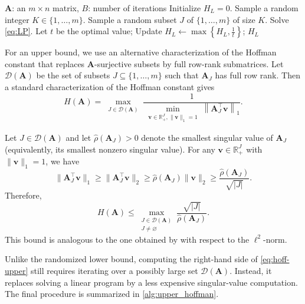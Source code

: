 \documentclass[10pt]{article}
\theoremstyle{definition}
\theoremstyle{remark}
\newcommand{\RR}{{\mathbb{R}}}
\def\vv{{\bm{v}}}
\def\mA{{\bm{A}}}
\begin{document}
\begin{algorithm}[ht]
  \caption{Randomized lower bound for the Hoffman constant}
    \begin{algorithmic}[1]
        \Require $\mA$: an $m\times n$ matrix, $B$: number of iterations
        \State Initialize $H_L=0$.
            \State Sample a random integer $K \in \{1, \dotsc, m\}$.
            \State Sample a random subset $J$ of $\{1,\dots,m\}$ of size $K$.
            \State Solve \eqref{eq:LP}. Let $t$ be the optimal value;
            \State Update $H_L \gets \max\left\{H_L,\frac{1}{t}\right\}$;
            \EndIf
        \EndFor
        \State \Return $H_L$ 
    \end{algorithmic}
    \label{alg:lower_hoffman}
\end{algorithm}

For an upper bound, we use an alternative characterization of the Hoffman constant that replaces $\mA$-surjective subsets by full row-rank submatrices. Let $\mathcal{D}(\mA)$ be the set of subsets $J\subseteq \{1,\ldots,m\}$ such that $\mA_J$ has full row rank. Then a standard characterization of the Hoffman constant
\citep{pena2018algorithm} gives
$$
H(\mA) = \max_{\substack{J \in \mathcal D(\mA)}}\frac{1}{\min_{\substack{\vv\in\mathbb{R}^J_+, \|\vv\|_1=1}}\left\|\mA_J^\top \vv\right\|_1}.
$$

Let $J \in \mathcal{D}(\mA)$ and let $\hat \rho(\mA_J)>0$ denote the smallest singular value of $\mA_J$ (equivalently, its smallest nonzero singular value). For any
$\vv \in \RR_+^J$ with $\|\vv\|_1=1$, we have
$$
\|\mA_J^\top\vv\|_1 \geq \|\mA_J^\top\vv\|_2 \geq
\hat\rho(\mA_J)\|\vv\|_2 \geq \frac{\hat\rho(\mA_J)}{\sqrt{|J|}}.
$$
Therefore,
\begin{equation}
\label{eq:hoff-upper}
    H(\mA) \leq \max_{\substack{J\in\mathcal{D}(\mA)\\J\neq\varnothing}}
    \frac{\sqrt{|J|}}{\hat\rho(\mA_J)}.
\end{equation}
This bound is analogous to the one obtained by \cite[Theorem 4.2]{guler1995approximations} with respect to the $\ell^2$-norm.

Unlike the randomized lower bound, computing the right-hand side of \cref{eq:hoff-upper} still requires iterating over a possibly large set $\mathcal{D}(\mA)$. Instead, it replaces solving a linear program by a less expensive singular-value computation. The final procedure is summarized in \cref{alg:upper_hoffman}.
\end{document}
